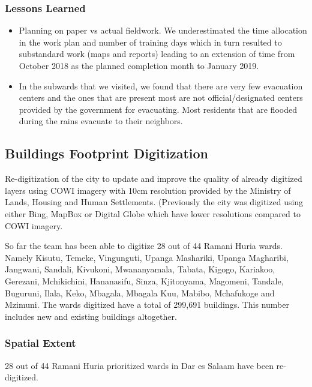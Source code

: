\documentclass[a4paper,12pt,twoside]{article}
\begin{document}
\subsubsection{Lessons Learned}
\begin{itemize}
	\item Planning on paper vs actual fieldwork. We underestimated the time allocation in the work plan and number of training days which in turn resulted to substandard work (maps and reports) leading to an extension of time from October 2018 as the planned completion month to January 2019.
	\item In the subwards that we visited, we found that there are very few evacuation centers and the ones that are present most are not official/designated centers provided by the government for evacuating. Most residents that are flooded during the rains evacuate to their neighbors.
\end{itemize}

\newpage
\subsection{Buildings Footprint Digitization}
\begin{multicols}{2}
Re-digitization of the city to update and improve the quality of already digitized layers using COWI imagery with 10cm resolution provided by the Ministry of Lands, Housing and Human Settlements. (Previously the city was digitized using either Bing, MapBox or Digital Globe which have lower resolutions compared to COWI imagery. 

So far the team has been able to digitize 28 out of 44 Ramani Huria wards. Namely Kisutu, Temeke, Vingunguti, Upanga Mashariki, Upanga Magharibi, Jangwani, Sandali, Kivukoni, Mwananyamala, Tabata, Kigogo, Kariakoo, Gerezani, Mchikichini, Hananasifu, Sinza, Kjitonyama, Magomeni, Tandale, Buguruni, Ilala, Keko, Mbagala, Mbagala Kuu, Mabibo, Mchafukoge and Mzimuni. The wards digitized have a total of 299,691 buildings. This number includes new and existing buildings altogether.
\end{multicols}

\subsubsection{Spatial Extent}
28 out of 44 Ramani Huria prioritized wards in Dar es Salaam have been re-digitized.
\end{document}
